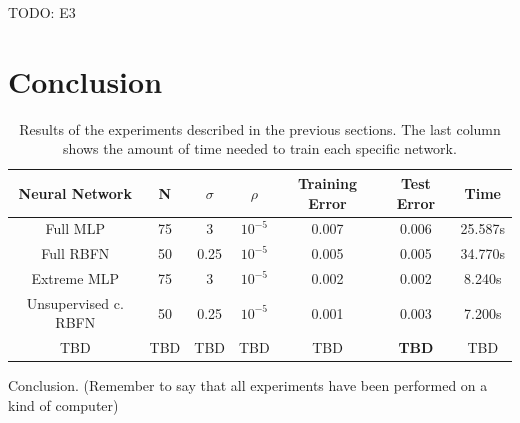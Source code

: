 \documentclass[a4paper]{article}
\numberwithin{equation}{section} %
\numberwithin{figure}{section} %
\numberwithin{table}{section} %
\theoremstyle{definition}
\begin{document}
TODO: E3


\section{Conclusion}

\begin{table}
	\footnotesize
	\centering
	\begin{tabular}{*{7}{c}}
		Neural Network & N & $\sigma$ & $\rho$ & Training Error & Test Error & Time \\
		\hline
		Full MLP & 75 & 3 & $10^{-5}$ & 0.007 & 0.006 & 25.587s \\
		Full RBFN & 50 & 0.25 & $10^{-5}$ & 0.005 & 0.005 & 34.770s \\
		Extreme MLP & 75 & 3 & $10^{-5}$ & 0.002 & 0.002 & 8.240s \\
		Unsupervised c. RBFN & 50 & 0.25 & $10^{-5}$ & 0.001 & 0.003 & 7.200s \\
		TBD & TBD & TBD & TBD & TBD & \textbf{TBD} & TBD \\
	\end{tabular}
	\caption{Results of the experiments described in the previous sections.
		The last column shows the amount of time needed to train each
		specific network.}
	\label{tab:experiments}
\end{table}

Conclusion. (Remember to say that all experiments have been performed on
a kind of computer)
\end{document}
